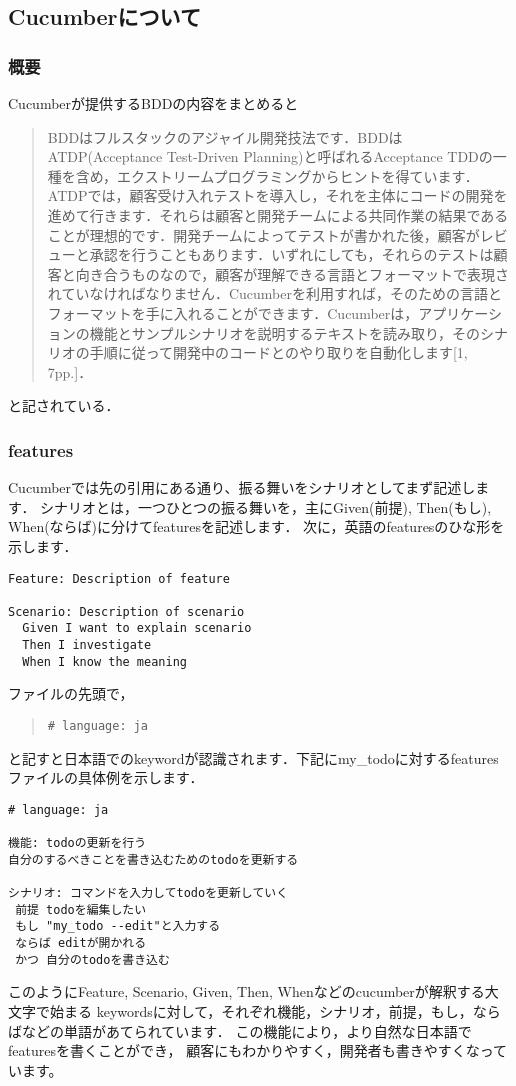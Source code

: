 
\subsection{Cucumberについて}
\subsubsection{概要}
Cucumberが提供するBDDの内容をまとめると

\begin{quotation}
BDDはフルスタックのアジャイル開発技法です．BDDはATDP(Acceptance Test-Driven Planning)と呼ばれるAcceptance TDDの一種を含め，エクストリームプログラミングからヒントを得ています．ATDPでは，顧客受け入れテストを導入し，それを主体にコードの開発を進めて行きます．それらは顧客と開発チームによる共同作業の結果であることが理想的です．開発チームによってテストが書かれた後，顧客がレビューと承認を行うこともあります．いずれにしても，それらのテストは顧客と向き合うものなので，顧客が理解できる言語とフォーマットで表現されていなければなりません．Cucumberを利用すれば，そのための言語とフォーマットを手に入れることができます．Cucumberは，アプリケーションの機能とサンプルシナリオを説明するテキストを読み取り，そのシナリオの手順に従って開発中のコードとのやり取りを自動化します[1, 7pp.]．

\end{quotation}
と記されている．

\subsubsection{features}
Cucumberでは先の引用にある通り、振る舞いをシナリオとしてまず記述します．
シナリオとは，一つひとつの振る舞いを，主にGiven(前提), Then(もし), When(ならば)に分けてfeaturesを記述します．
次に，英語のfeaturesのひな形を示します．
\begin{lstlisting}[style=customRuby]
% cat ./featrues/sample_e.feature
Feature: Description of feature

Scenario: Description of scenario
  Given I want to explain scenario
  Then I investigate
  When I know the meaning
\end{lstlisting}
ファイルの先頭で，
\begin{quote}\begin{verbatim}
# language: ja
\end{verbatim}\end{quote}
と記すと日本語でのkeywordが認識されます．下記にmy\_todoに対するfeaturesファイルの具体例を示します．
\begin{lstlisting}[style=customCsh]
# language: ja

機能: todoの更新を行う
自分のするべきことを書き込むためのtodoを更新する

シナリオ: コマンドを入力してtodoを更新していく
 前提 todoを編集したい
 もし "my_todo --edit"と入力する
 ならば editが開かれる
 かつ 自分のtodoを書き込む
\end{lstlisting}
このようにFeature, Scenario, Given, Then, Whenなどのcucumberが解釈する大文字で始まる
keywordsに対して，それぞれ機能，シナリオ，前提，もし，ならばなどの単語があてられています．
この機能により，より自然な日本語でfeaturesを書くことができ，
顧客にもわかりやすく，開発者も書きやすくなっています。

